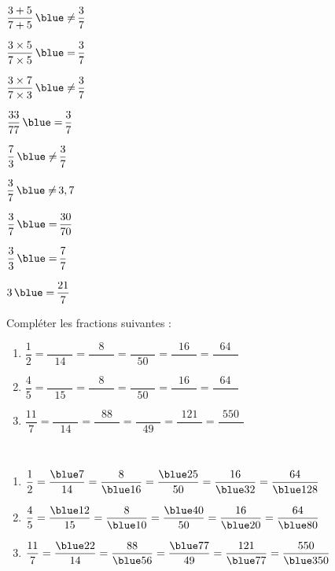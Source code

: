 \begin{colonne*exercice}
\begin{corrige}
    \begin{colenumerate}{3}
      \item $\dfrac{3+5}{7+5} \, {\blue \neq} \, \dfrac{3}{7}$ \medskip
      \item $\dfrac{3\times5}{7\times5} \, {\blue =} \, \dfrac{3}{7}$ \medskip
      \item $\dfrac{3\times7}{7\times3} \, {\blue \neq} \, \dfrac{3}{7}$ \medskip
      \item $\dfrac{33}{77} \, {\blue =} \,  \dfrac{3}{7}$
      \item $\dfrac{7}{3} \, {\blue \neq} \, \dfrac{3}{7}$
      \item $\dfrac{3}{7} \, {\blue \neq} \, 3,7$
      \item $\dfrac{3}{7} \, {\blue =} \, \dfrac{30}{70}$
      \item $\dfrac{3}{3} \, {\blue =} \, \dfrac{7}{7}$
      \item $3 \, {\blue =} \, \dfrac{21}{7}$
   \end{colenumerate}
\end{corrige}

\medskip


\begin{exercice} %
   Compléter les fractions suivantes : \medskip
   \begin{enumerate}
      \item $\dfrac{1}{2} =\dfrac{\qquad\;}{14} =\dfrac{8}{\qquad\;} =\dfrac{\qquad\;}{50} =\dfrac{16}{\qquad\;} =\dfrac{64}{\qquad\;}$ \\ [2mm]
      \item $\dfrac{4}{5} =\dfrac{\qquad\;}{15} =\dfrac{8}{\qquad\;} =\dfrac{\qquad\;}{50} =\dfrac{16}{\qquad\;} =\dfrac{64}{\qquad\;}$ \\ [2mm]
      \item $\dfrac{11}{7} =\dfrac{\qquad\;}{14} =\dfrac{88}{\qquad\;} =\dfrac{\qquad\;}{49} =\dfrac{121}{\qquad\;} =\dfrac{550}{\qquad\;}$ \\
   \end{enumerate}
\end{exercice}

\begin{corrige}
   \ \\ [-5mm]
   \begin{enumerate}
      \item $\dfrac{1}{2} =\dfrac{\blue 7}{14} =\dfrac{8}{\blue 16} =\dfrac{\blue 25}{50} =\dfrac{16}{\blue 32} =\dfrac{64}{\blue 128}$ \\ [2mm]
      \item $\dfrac{4}{5} =\dfrac{\blue 12}{15} =\dfrac{8}{\blue 10} =\dfrac{\blue 40}{50} =\dfrac{16}{\blue 20} =\dfrac{64}{\blue 80}$ \\ [2mm]
      \item $\dfrac{11}{7} =\dfrac{\blue 22}{14} =\dfrac{88}{\blue 56} =\dfrac{\blue 77}{49} =\dfrac{121}{\blue 77} =\dfrac{550}{\blue 350}$
   \end{enumerate}
\end{corrige}


\end{colonne*exercice}
